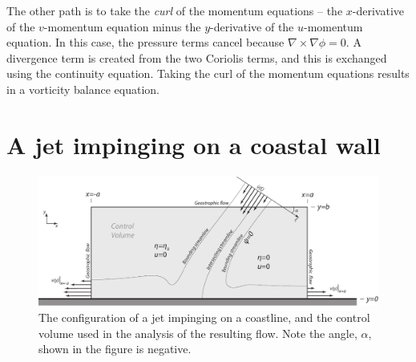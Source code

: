 \documentclass[11pt]{report}
\numberwithin{equation}{section}
\begin{document}
The other path is to take the {\it curl} of the momentum equations -- the $x$-derivative of the $v$-momentum equation minus the $y$-derivative of the $u$-momentum equation.  In this case, the pressure terms cancel because $\nabla \times \nabla \phi = 0$.  A divergence term is created from the two Coriolis terms, and this is exchanged using the continuity equation.  Taking the curl of the momentum equations results in a vorticity balance equation.

\section{A jet impinging on a coastal wall\\
\normalsize\citet{whitehead:85}}

\begin{figure}[tb]
    \centering
    \includegraphics[width=6.5in]{impinging-jet} 
    \caption{The configuration of a jet impinging on a coastline, and the control volume used in the analysis of the resulting flow.  Note the angle, $\alpha$, shown in the figure is negative.}
    \label{fig:impinging-jet}
\end{figure}
\end{document}
